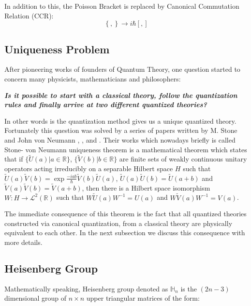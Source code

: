 \documentclass[12pt]{article}
\begin{document}
In addition to this, the Poisson Bracket is replaced by Canonical Commutation Relation (CCR):
\begin{equation}\label{Poisson 3}
 \left\{ ,\right\}\rightarrow i\hbar \left[ , \right]
\end{equation}

\subsection{Uniqueness Problem }\label{subsecgtion.von Neumann}

After pioneering works of founders of Quantum Theory, one question started to concern many physicists, mathematicians and philosophers:

\emph{\textbf{Is it possible to start with a classical theory, follow the quantization rules and finally arrive at two different quantized theories? }}

In other words is the quantization method gives us a unique quantized theory.
 Fortunately this question was solved by a series of papers written by M. Stone and John von Neumann \cite{Stone1930}, \cite{Neumann1931},  \cite{Neumann1932} and  \cite{Stone1932}. Their works which nowadays briefly is called  Stone- von Neumann uniqueness theorem is a mathematical theorem which states that if $\{\tilde{U}(a)| a\in\mathbb{R}\}$, $\{\tilde{V}(b)| b\in\mathbb{R}\}$ are finite sets of weakly continuous unitary operators acting irreducibly on a separable Hilbert space $H$ such that $\tilde{U}(a)\tilde{V}(b)=\exp{\frac{-iab}{\hbar}}\tilde{V}(b)\tilde{U}(a)$, $\tilde{U}(a)\tilde{U}(b)=\tilde{U}(a+b)$ and $\tilde{V}(a)\tilde{V}(b)=\tilde{V}(a+b)$, then there is a Hilbert space isomorphism $W:H\rightarrow \mathcal{L}^2 (\mathbb{R})$ such that $W\tilde{U}(a)W^{-1}=U(a)$ and $W\tilde{V}(a)W^{-1}=V(a)$.

The immediate consequence of this theorem is the fact that all quantized theories constructed via canonical quantization, from a classical theory are physically equivalent to each other. In the next subsection we discuss this consequence with more details.
\subsection{Heisenberg Group}\label{H}
 Mathematically speaking, Heisenberg group denoted as $\mathbb{H}_n$ is the $(2n-3)$ dimensional group of $n\times n$ upper triangular matrices of the form:
\end{document}
